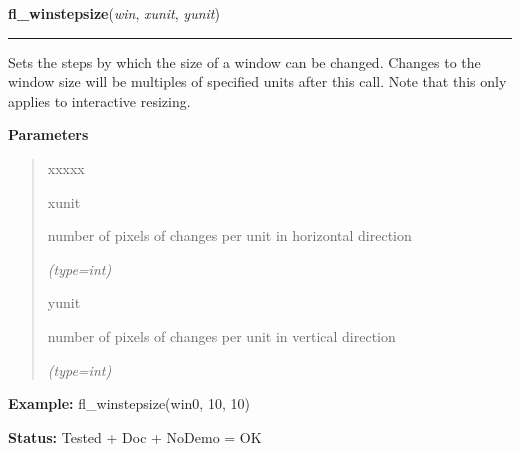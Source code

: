 \hspace{.8\funcindent}\begin{boxedminipage}{\funcwidth}

    \raggedright \textbf{fl\_winstepsize}(\textit{win}, \textit{xunit}, \textit{yunit})

    \vspace{-1.5ex}

    \rule{\textwidth}{0.5\fboxrule}
\setlength{\parskip}{2ex}
    Sets the steps by which the size of a window can be changed. Changes to
    the window size will be multiples of specified units after this call. 
    Note that this only applies to interactive resizing.

\setlength{\parskip}{1ex}
      \textbf{Parameters}
      \vspace{-1ex}

      \begin{quote}
        \begin{Ventry}{xxxxx}

          \item[xunit]

          number of pixels of changes per unit in horizontal direction

            {\it (type=int)}

          \item[yunit]

          number of pixels of changes per unit in vertical direction

            {\it (type=int)}

        \end{Ventry}

      \end{quote}

\textbf{Example:} fl\_winstepsize(win0, 10, 10)



\textbf{Status:} Tested + Doc + NoDemo = OK



    \end{boxedminipage}

    \label{xformslib:flxbasic:fl_winstepsize}

    \vspace{0.5ex}


